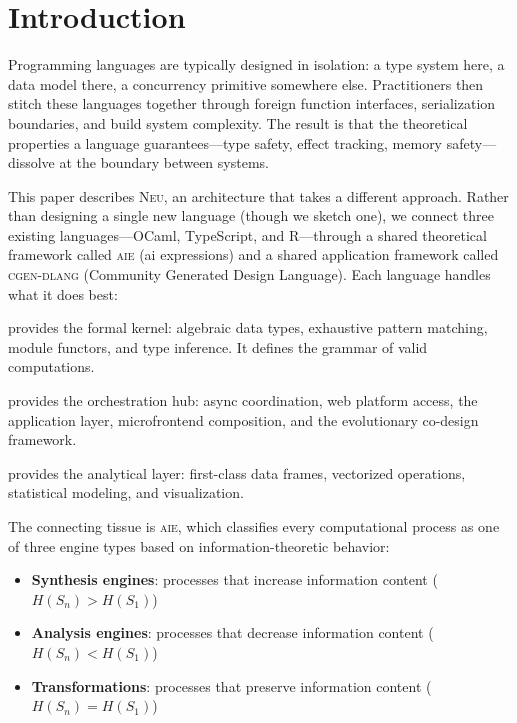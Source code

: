 \documentclass[11pt,letterpaper]{article}
\newcommand{\neu}{\textsc{Neu}}
\newcommand{\aie}{\textsc{aie}}
\newcommand{\cgen}{\textsc{cgen-dlang}}
\begin{document}
\tableofcontents
\newpage

\section{Introduction}

Programming languages are typically designed in isolation: a type system here, a data model there, a concurrency primitive somewhere else. Practitioners then stitch these languages together through foreign function interfaces, serialization boundaries, and build system complexity. The result is that the theoretical properties a language guarantees---type safety, effect tracking, memory safety---dissolve at the boundary between systems.

This paper describes \neu{}, an architecture that takes a different approach. Rather than designing a single new language (though we sketch one), we connect three existing languages---OCaml, TypeScript, and R---through a shared theoretical framework called \aie{} (ai expressions) and a shared application framework called \cgen{} (Community Generated Design Language). Each language handles what it does best:

\begin{description}[leftmargin=*,style=nextline]
  \item[OCaml] provides the formal kernel: algebraic data types, exhaustive pattern matching, module functors, and type inference. It defines the grammar of valid computations.
  \item[TypeScript] provides the orchestration hub: async coordination, web platform access, the application layer, microfrontend composition, and the evolutionary co-design framework.
  \item[R] provides the analytical layer: first-class data frames, vectorized operations, statistical modeling, and visualization.
\end{description}

The connecting tissue is \aie{}, which classifies every computational process as one of three engine types based on information-theoretic behavior:

\begin{itemize}[leftmargin=*]
  \item \textbf{Synthesis engines}: processes that increase information content ($H(S_n) > H(S_1)$)
  \item \textbf{Analysis engines}: processes that decrease information content ($H(S_n) < H(S_1)$)
  \item \textbf{Transformations}: processes that preserve information content ($H(S_n) = H(S_1)$)
\end{itemize}
\end{document}
